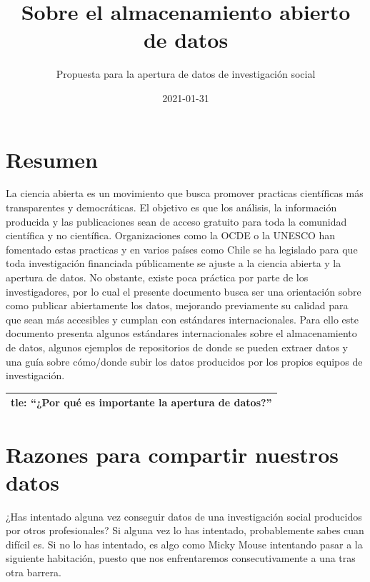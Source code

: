 \documentclass[
  14pt,
]{book}
\title{Sobre el almacenamiento abierto de datos}
\subtitle{Propuesta para la apertura de datos de investigación social}
\author{}
\date{\vspace{-2.5em}2021-01-31}
\begin{document}
\maketitle

{
\setcounter{tocdepth}{1}
\tableofcontents
}
\hypertarget{resumen}{%
\chapter{Resumen}\label{resumen}}

La ciencia abierta es un movimiento que busca promover practicas científicas más transparentes y democráticas. El objetivo es que los análisis, la información producida y las publicaciones sean de acceso gratuito para toda la comunidad científica y no científica. Organizaciones como la OCDE o la UNESCO han fomentado estas practicas y en varios países como Chile se ha legislado para que toda investigación financiada públicamente se ajuste a la ciencia abierta y la apertura de datos. No obstante, existe poca práctica por parte de los investigadores, por lo cual el presente documento busca ser una orientación sobre como publicar abiertamente los datos, mejorando previamente su calidad para que sean más accesibles y cumplan con estándares internacionales. Para ello este documento presenta algunos estándares internacionales sobre el almacenamiento de datos, algunos ejemplos de repositorios de donde se pueden extraer datos y una guía sobre cómo/donde subir los datos producidos por los propios equipos de investigación.

\begin{longtable}[]{@{}l@{}}
\toprule
\endhead
tle: ``¿Por qué es importante la apertura de datos?''\tabularnewline
\bottomrule
\end{longtable}

\hypertarget{razones-para-compartir-nuestros-datos}{%
\chapter{Razones para compartir nuestros datos}\label{razones-para-compartir-nuestros-datos}}

¿Has intentado alguna vez conseguir datos de una investigación social producidos por otros profesionales? Si alguna vez lo has intentado, probablemente sabes cuan difícil es. Si no lo has intentado, es algo como Micky Mouse intentando pasar a la siguiente habitación, puesto que nos enfrentaremos consecutivamente a una tras otra barrera.
\end{document}
